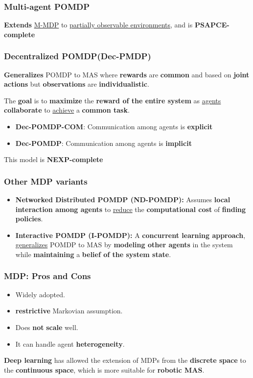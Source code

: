 \documentclass{beamer}
\begin{document}
	\begin{frame}
		\frametitle{Multi-agent POMDP}
		\textbf{Extends} \underline{M-MDP} to \underline{partially observable environments}, and is \textbf{PSAPCE-complete}
	\end{frame}

	\begin{frame}
		\frametitle{Decentralized POMDP(Dec-PMDP)}
		\textbf{Generalizes} POMDP to MAS where \textbf{rewards} are \textbf{common} and based on \textbf{joint actions} but \textbf{observations} are \textbf{individualistic}. 
		
		\vspace{0.1in}
		The \textbf{goal} is to \textbf{maximize} the \textbf{reward of the entire system} as \underline{agents} \textbf{collaborate} to \underline{achieve} a\textbf{ common task}. 
		
		\vspace{0.1in}
		\begin{itemize}
			\item \textbf{Dec-POMDP-COM}: Communication among agents is \textbf{explicit}
			\item  \textbf{Dec-POMDP}: Communication among agents is \textbf{implicit} 
		\end{itemize}
		\vspace{0.1in}
		This model is \textbf{NEXP-complete}
	\end{frame}

	\begin{frame}
		\frametitle{Other MDP variants}
		\begin{itemize}
			\item \textbf{Networked Distributed POMDP (ND-POMDP):} Assumes \textbf{local interaction among agents} to \underline{reduce} the \textbf{computational cost} of \textbf{finding policies}.
			\item \textbf{Interactive POMDP (I-POMDP):} A \textbf{concurrent learning approach}, \underline{generalizes} POMDP to MAS by\textbf{ modeling other agents} in the system while \textbf{maintaining} a \textbf{belief of the system state}.
		\end{itemize}
	\end{frame}

	\begin{frame}
		\frametitle{MDP: Pros and Cons}
		\begin{itemize}
			\item Widely adopted.
			\item \textbf{restrictive} Markovian assumption.
			\item Does \textbf{not} \textbf{scale} well.
			\item It can handle agent \textbf{heterogeneity}.
		\end{itemize}
		\vspace{0.1in}
		\textbf{Deep learning} has allowed the extension of MDPs from the \textbf{discrete space} to the \textbf{continuous space}, which is more suitable for \textbf{robotic MAS}.
	\end{frame}
	
\end{document}
